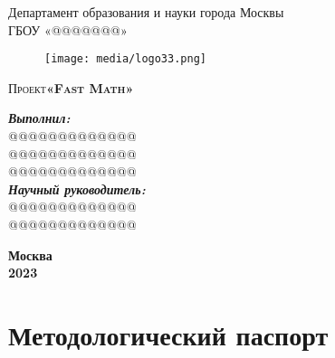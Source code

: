 \documentclass[a4paper, 14pt]{extarticle}
\begin{document}
\begin{titlepage}
\begin{center}
Департамент образования и науки города Москвы\\
ГБОУ «@@@@@@@»\\
\end{center}


\begin{figure}[h]
\centering
\texttt{[image: media/logo33.png]}
\end{figure}

\vspace{2em}

\begin{center}
\large\textsc{Проект\textbf{\linebreak «Fast Math»}}
\end{center}

\vspace{6em}

\begin{flushright}
\textbf{\textit{Выполнил:}}\\
@@@@@@@@@@@@@\\
@@@@@@@@@@@@@\\
@@@@@@@@@@@@@\\
\textbf{\textit{Научный руководитель:}}\\
@@@@@@@@@@@@@\\
@@@@@@@@@@@@@\\
\vspace{2em}
\underline{\hspace{14em}}
\end{flushright}

\vspace{6em}

\begin{center}
\textbf{Москва \\2023}
\end{center}

\end{titlepage}

\tableofcontents
\newpage

\section{Методологический паспорт}
\newpage
\end{document}
